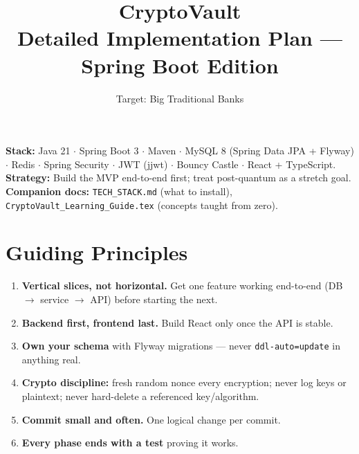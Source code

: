 \documentclass[11pt,a4paper]{article}
\title{\vspace{-1cm}\textbf{CryptoVault}\\[4pt]
\large Detailed Implementation Plan — Spring Boot Edition}
\author{Target: Big Traditional Banks}
\date{}
\newcommand{\code}[1]{\texttt{#1}}
\begin{document}
\maketitle
\thispagestyle{fancy}

\begin{note}
\textbf{Stack:} Java 21 $\cdot$ Spring Boot 3 $\cdot$ Maven $\cdot$ MySQL 8 (Spring Data JPA + Flyway)
$\cdot$ Redis $\cdot$ Spring Security $\cdot$ JWT (jjwt) $\cdot$ Bouncy Castle $\cdot$ React + TypeScript.\\[4pt]
\textbf{Strategy:} Build the MVP end-to-end first; treat post-quantum as a stretch goal.\\[2pt]
\textbf{Companion docs:} \code{TECH\_STACK.md} (what to install), \code{CryptoVault\_Learning\_Guide.tex}
(concepts taught from zero).
\end{note}

\tableofcontents
\newpage

\section{Guiding Principles}
\begin{enumerate}[leftmargin=*]
  \item \textbf{Vertical slices, not horizontal.} Get one feature working end-to-end (DB $\to$ service $\to$ API) before starting the next.
  \item \textbf{Backend first, frontend last.} Build React only once the API is stable.
  \item \textbf{Own your schema} with Flyway migrations — never \code{ddl-auto=update} in anything real.
  \item \textbf{Crypto discipline:} fresh random nonce every encryption; never log keys or plaintext; never hard-delete a referenced key/algorithm.
  \item \textbf{Commit small and often.} One logical change per commit.
  \item \textbf{Every phase ends with a test} proving it works.
\end{enumerate}

\end{document}
